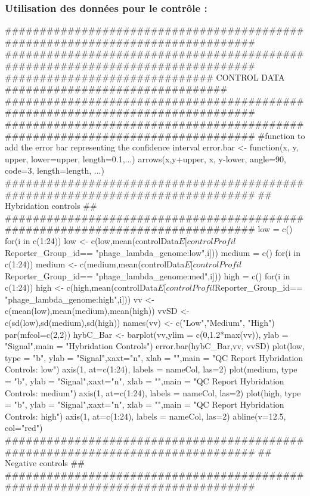 \documentclass[a4paper,10pt]{article}
\begin{document}
\subsubsection{Utilisation des données pour le contrôle :}
\begin{Schunk}
\begin{Sinput}
 ###############################################################################
 ###############################################################################
 ############################## CONTROL DATA	################################
 ###############################################################################
 ###############################################################################
 #function to add the error bar representing the confidence interval
 error.bar <- function(x, y, upper, lower=upper, length=0.1,...){
   arrows(x,y+upper, x, y-lower, angle=90, code=3, length=length, ...)
 }
 ###############################################################################
 ## Hybridation controls                                                      ##
 ###############################################################################
 low = c()
 for(i in c(1:24)){
   low <- c(low,mean(controlData$E[controlProfil$Reporter_Group_id==
   "phage_lambda_genome:low",i]))
 }
 medium = c()
 for(i in c(1:24)){
   medium <- c(medium,mean(controlData$E[controlProfil$Reporter_Group_id==
   "phage_lambda_genome:med",i]))
 }
 high = c()
 for(i in c(1:24)){
   high <- c(high,mean(controlData$E[controlProfil$Reporter_Group_id==
   "phage_lambda_genome:high",i]))
 }
 vv <- c(mean(low),mean(medium),mean(high))
 vvSD <- c(sd(low),sd(medium),sd(high))
 names(vv) <- c("Low","Medium", "High")
 par(mfcol=c(2,2))
 hybC_Bar <- barplot(vv,ylim = c(0,1.2*max(vv)), ylab = "Signal",main = 
 "Hybridation Controls")
 error.bar(hybC_Bar,vv, vvSD)
 plot(low, type = "b", ylab = "Signal",xaxt="n", xlab = "",main = 
 "QC Report Hybridation Controls: low")
 axis(1, at=c(1:24), labels = nameCol, las=2)
 plot(medium, type = "b", ylab = "Signal",xaxt="n", xlab = "",main = 
 "QC Report Hybridation Controls: medium")
 axis(1, at=c(1:24), labels = nameCol, las=2)
 plot(high, type = "b", ylab = "Signal",xaxt="n", xlab = "",main = 
 "QC Report Hybridation Controls: high")
 axis(1, at=c(1:24), labels = nameCol, las=2)
 abline(v=12.5, col="red")
 ###############################################################################
 ## Negative controls                                                         ##
 ###############################################################################

\end{Sinput}
\end{Schunk}
\end{document}
